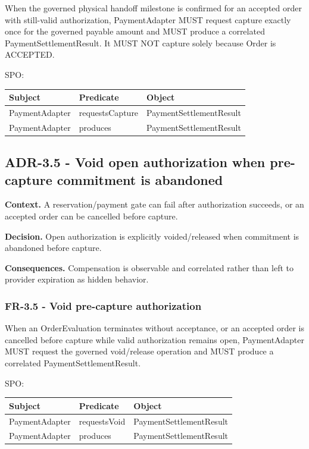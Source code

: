 \documentclass[
  10pt,
]{article}
\begin{document}
When the governed physical handoff milestone is confirmed for an
accepted order with still-valid authorization, PaymentAdapter MUST
request capture exactly once for the governed payable amount and MUST
produce a correlated PaymentSettlementResult. It MUST NOT capture solely
because Order is ACCEPTED.

SPO:

\begin{longtable}[]{@{}lll@{}}
\toprule\noalign{}
Subject & Predicate & Object \\
\midrule\noalign{}
\endhead
\bottomrule\noalign{}
\endlastfoot
PaymentAdapter & requestsCapture & PaymentSettlementResult \\
PaymentAdapter & produces & PaymentSettlementResult \\
\end{longtable}

\subsection{ADR-3.5 - Void open authorization when pre-capture
commitment is
abandoned}\label{adr-35---void-open-authorization-when-pre-capture-commitment-is-abandoned}

\textbf{Context.} A reservation/payment gate can fail after
authorization succeeds, or an accepted order can be cancelled before
capture.

\textbf{Decision.} Open authorization is explicitly voided/released when
commitment is abandoned before capture.

\textbf{Consequences.} Compensation is observable and correlated rather
than left to provider expiration as hidden behavior.

\subsubsection{FR-3.5 - Void pre-capture
authorization}\label{fr-35---void-pre-capture-authorization}

When an OrderEvaluation terminates without acceptance, or an accepted
order is cancelled before capture while valid authorization remains
open, PaymentAdapter MUST request the governed void/release operation
and MUST produce a correlated PaymentSettlementResult.

SPO:

\begin{longtable}[]{@{}lll@{}}
\toprule\noalign{}
Subject & Predicate & Object \\
\midrule\noalign{}
\endhead
\bottomrule\noalign{}
\endlastfoot
PaymentAdapter & requestsVoid & PaymentSettlementResult \\
PaymentAdapter & produces & PaymentSettlementResult \\
\end{longtable}
\end{document}
